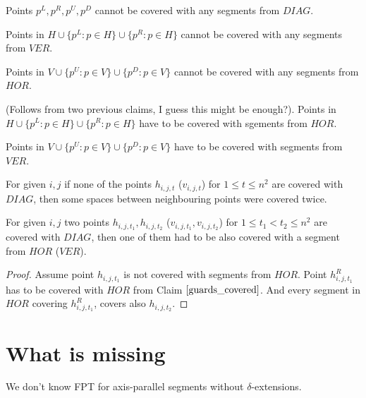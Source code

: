 \begin{claim}
\label{guards}
Points $p^{L}, p^R, p^U, p^D$ cannot be covered with
any segments from $DIAG$.
\end{claim}

\begin{claim}
\label{hor_ver_sound}
Points in $H \cup \{p^L : p \in H\} \cup \{p^R : p \in H\}$
cannot be covered with any segments from $VER$.

Points in $V \cup \{p^U : p \in V\} \cup \{p^D : p \in V\} $
cannot be covered with any segments from $HOR$.
\end{claim}


\begin{claim}
\label{guards_covered}
(Follows from two previous claims, I guess this might be enough?).
Points in $H \cup \{p^L : p \in H\} \cup \{p^R : p \in H\}$
have to be covered with sgements from $HOR$.

Points in $V \cup \{p^U : p \in V\} \cup \{p^D : p \in V\} $
have to be covered with segments from $VER$.
\end{claim}

\begin{claim}
For given $i, j$ if none of the points $h_{i, j, t}$ ($v_{i, j, t}$)
for $1 \le t \le n^2$ are covered with $DIAG$,
then some spaces between neighbouring points were covered twice.
\end{claim}


\begin{claim}
\label{one_diag_in_square}
For given $i, j$ two points $h_{i, j, t_1}, h_{i, j, t_2}$
($v_{i, j, t_1}, v_{i, j, t_2}$)
for $1 \le t_1 < t_2 \le n^2$ are covered with $DIAG$,
then one of them had to be also covered with a segment from $HOR$
($VER$).
\end{claim}
\begin{proof}
Assume point $h_{i, j, t_1}$ is not covered with
segments from $HOR$.
Point $h^R_{i, j, t_1}$ has to be covered with $HOR$
from Claim $\ref{guards_covered}$.
And every segment in $HOR$ covering $h^R_{i, j, t_1}$,
covers also $h_{i, j, t_2}$.
\end{proof}


\section{What is missing}
We don't know FPT for axis-parallel segments without $\delta$-extensions.
